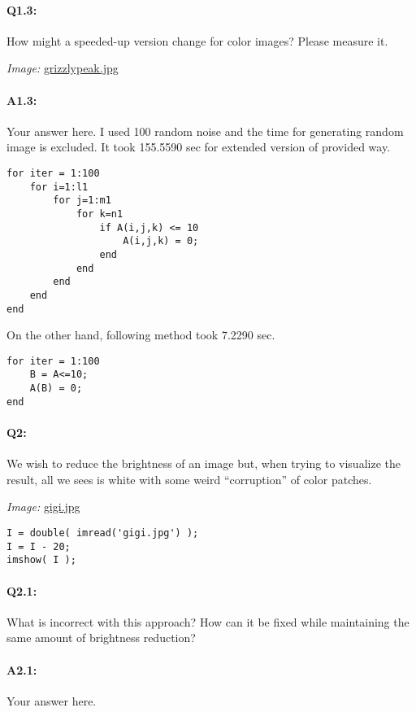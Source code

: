 \documentclass[11pt]{article}
\begin{document}
\paragraph{Q1.3:} How might a speeded-up version change for color images? Please measure it.

\emph{Image:} \href{grizzlypeak.jpg}{grizzlypeak.jpg}

\paragraph{A1.3:} Your answer here.
I used 100 random noise and the time for generating random image is excluded. 
It took 155.5590 sec for extended version of provided way.

\begin{lstlisting}[style=Matlab-editor]
for iter = 1:100
	for i=1:l1
		for j=1:m1
			for k=n1
				if A(i,j,k) <= 10
					A(i,j,k) = 0;
				end
			end
		end
	end
end
\end{lstlisting}

On the other hand, following method took 7.2290 sec.
\begin{lstlisting}[style=Matlab-editor]
for iter = 1:100
	B = A<=10;
	A(B) = 0;
end
\end{lstlisting}



\pagebreak
\paragraph{Q2:} We wish to reduce the brightness of an image but, when trying to visualize the result, all we sees is white with some weird ``corruption'' of color patches.

\emph{Image:} \href{gigi.jpg}{gigi.jpg}

\begin{lstlisting}[style=Matlab-editor]
I = double( imread('gigi.jpg') );
I = I - 20;
imshow( I );
\end{lstlisting}

\paragraph{Q2.1:} What is incorrect with this approach? How can it be fixed while maintaining the same amount of brightness reduction?

\paragraph{A2.1:} Your answer here.
\end{document}
